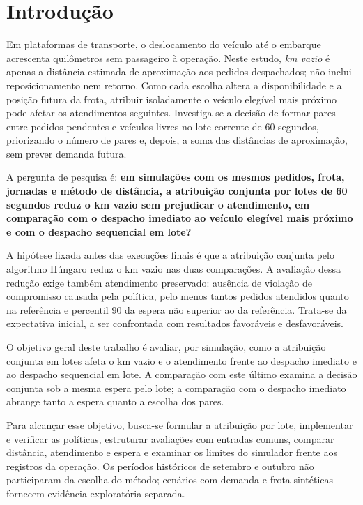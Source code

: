 \section{Introdução}

Em plataformas de transporte, o deslocamento do veículo até o embarque acrescenta quilômetros sem passageiro à operação. Neste estudo, \textit{km vazio} é apenas a distância estimada de aproximação aos pedidos despachados; não inclui reposicionamento nem retorno. Como cada escolha altera a disponibilidade e a posição futura da frota, atribuir isoladamente o veículo elegível mais próximo pode afetar os atendimentos seguintes. Investiga-se a decisão de formar pares entre pedidos pendentes e veículos livres no lote corrente de 60 segundos, priorizando o número de pares e, depois, a soma das distâncias de aproximação, sem prever demanda futura.

A pergunta de pesquisa é: \textbf{em simulações com os mesmos pedidos, frota, jornadas e método de distância, a atribuição conjunta por lotes de 60 segundos reduz o km vazio sem prejudicar o atendimento, em comparação com o despacho imediato ao veículo elegível mais próximo e com o despacho sequencial em lote?}

A hipótese fixada antes das execuções finais é que a atribuição conjunta pelo algoritmo Húngaro \cite{kuhn1955, munkres1957} reduz o km vazio nas duas comparações. A avaliação dessa redução exige também atendimento preservado: ausência de violação de compromisso causada pela política, pelo menos tantos pedidos atendidos quanto na referência e percentil 90 da espera não superior ao da referência. Trata-se da expectativa inicial, a ser confrontada com resultados favoráveis e desfavoráveis.

O objetivo geral deste trabalho é avaliar, por simulação, como a atribuição conjunta em lotes afeta o km vazio e o atendimento frente ao despacho imediato e ao despacho sequencial em lote. A comparação com este último examina a decisão conjunta sob a mesma espera pelo lote; a comparação com o despacho imediato abrange tanto a espera quanto a escolha dos pares.

Para alcançar esse objetivo, busca-se formular a atribuição por lote, implementar e verificar as políticas, estruturar avaliações com entradas comuns, comparar distância, atendimento e espera e examinar os limites do simulador frente aos registros da operação. Os períodos históricos de setembro e outubro não participaram da escolha do método; cenários com demanda e frota sintéticas fornecem evidência exploratória separada.

